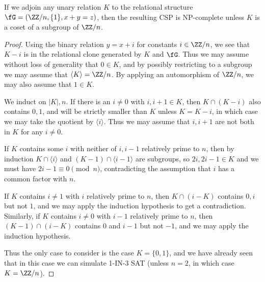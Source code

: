 \begin{prop} If we adjoin any unary relation $K$ to the relational structure $\fG = (\ZZ/n, \{1\}, x+y=z)$, then the resulting CSP is NP-complete unless $K$ is a coset of a subgroup of $\ZZ/n$.
\end{prop}
\begin{proof} Using the binary relation $y = x+i$ for constants $i \in \ZZ/n$, we see that $K-i$ is in the relational clone generated by $K$ and $\fG$. Thus we may assume without loss of generality that $0 \in K$, and by possibly restricting to a subgroup we may assume that $\langle K\rangle = \ZZ/n$. By applying an automorphism of $\ZZ/n$, we may also assume that $1 \in K$.

We induct on $|K|, n$. If there is an $i \ne 0$ with $i,i+1 \in K$, then $K \cap (K-i)$ also contains $0,1$, and will be strictly smaller than $K$ unless $K = K-i$, in which case we may take the quotient by $\langle i\rangle$. Thus we may assume that $i,i+1$ are not both in $K$ for any $i \ne 0$.

If $K$ contains some $i$ with neither of $i,i-1$ relatively prime to $n$, then by induction $K\cap \langle i\rangle$ and $(K-1)\cap \langle i-1\rangle$ are subgroups, so $2i, 2i-1 \in K$ and we must have $2i-1 \equiv 0 \pmod{n}$, contradicting the assumption that $i$ has a common factor with $n$.

If $K$ contains $i\ne 1$ with $i$ relatively prime to $n$, then $K\cap (i-K)$ contains $0,i$ but not $1$, and we may apply the induction hypothesis to get a contradiction. Similarly, if $K$ contains $i\ne 0$ with $i-1$ relatively prime to $n$, then $(K-1)\cap (i-K)$ contains $0$ and $i-1$ but not $-1$, and we may apply the induction hypothesis.

Thus the only case to consider is the case $K = \{0,1\}$, and we have already seen that in this case we can simulate 1-IN-3 SAT (unless $n=2$, in which case $K = \ZZ/n$).
\begin{comment}
Suppose that $\phi$ is any $k$-ary polymorphism of $\fG$ which is not a projection. We will show that $x-y+z \in \Clo(\phi)$, so if $\phi$ preserves $K$ then $K$ is a coset of a subgroup. Since $\phi$ preserves $x+y=z$ $\phi$ is linear, so there exist $r_1, ..., r_k \in \ZZ/n$ such that
\[
\phi(x_1, ..., x_k) = \sum_i r_ix_i,
\]
and since $\phi$ preserves $\{1\}$ we have $\sum_i r_i = 1$. Assume without loss of generality that no $r_i$ is $0$. If all the $r_i$ are equal to $1$, then $k \equiv 1\pmod{n}$ and $\phi(x,y,...,y,z) = x + (k-2)y + z = x-y+z$.

Otherwise, some $r_i \ne 0,1$, so if we set $f(x,y) = \phi(y,...,y,x,y,...,y)$ with the $x$ in the $i$th position, we get $f(x,y) = r_ix + (1-r_i)y$. Let $r = r_i$. At least one of $r, 1-r$ is relatively prime to $n$, assume without loss of generality that it is $r$. Then by iterating $f$ in the first variable, i.e. by considering expressions of the form $f(\cdots f(f(x,y),y)\cdots, y)$, we see that $r^jx + (1-r^j)y \in \Clo(f)$ for each $j$, so in particular $f^-(x,y) = r^{-1}x + (1-r^{-1})y \in \Clo(f)$. Then $f(f^-(x,y),z) = x + (r-1)y + (1-r)z$.
\end{comment}
\end{proof}


